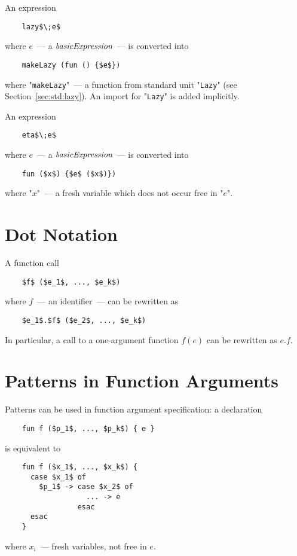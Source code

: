 An expression

\begin{lstlisting}
    lazy$\;e$
\end{lstlisting}

where $e$~--- a $\textit{basicExpression}$~--- is converted into

\begin{lstlisting}
    makeLazy (fun () {$e$})    
\end{lstlisting}

where "\lstinline|makeLazy|"~--- a function from standard unit "\lstinline|Lazy|" (see Section~\ref{sec:std:lazy}). An import for
"\lstinline|Lazy|" is added implicitly.

An expression

\begin{lstlisting}
    eta$\;e$
\end{lstlisting}

where $e$~--- a $\textit{basicExpression}$~--- is converted into

\begin{lstlisting}
    fun ($x$) {$e$ ($x$)})    
\end{lstlisting}

where "$x$"~--- a fresh variable which does not occur free in "$e$".

\section{Dot Notation}

A function call

\begin{lstlisting}
    $f$ ($e_1$, ..., $e_k$)
\end{lstlisting}

where $f$~--- an identifier~--- can be rewritten as

\begin{lstlisting}
    $e_1$.$f$ ($e_2$, ..., $e_k$)
\end{lstlisting}

In particular, a call to a one-argument function $f (e)$ can be rewritten as $e.f$.

\section{Patterns in Function Arguments}

Patterns can be used in function argument specification: a declaration

\begin{lstlisting}
    fun f ($p_1$, ..., $p_k$) { e }
\end{lstlisting}

is equivalent to

\begin{lstlisting}
    fun f ($x_1$, ..., $x_k$) {
      case $x_1$ of
        $p_1$ -> case $x_2$ of
                   ... -> e
                 esac
      esac
    }
\end{lstlisting}

where $x_i$~--- fresh variables, not free in $e$.

